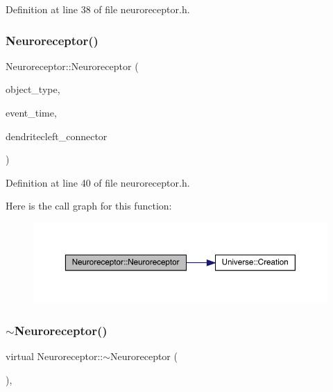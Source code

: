 Definition at line 38 of file neuroreceptor.\+h.

\mbox{\label{class_neuroreceptor_ab002bab3b4ffeed402f60e574ce0263e}} 
\subsubsection{\texorpdfstring{Neuroreceptor()}{Neuroreceptor()}\hspace{0.1cm}{\footnotesize\ttfamily [4/4]}}
{\footnotesize\ttfamily Neuroreceptor\+::\+Neuroreceptor (\begin{DoxyParamCaption}\item[{unsigned int}]{object\+\_\+type,  }\item[{std\+::chrono\+::time\+\_\+point$<$ \mbox{\hyperlink{universe_8h_a0ef8d951d1ca5ab3cfaf7ab4c7a6fd80}{Clock}} $>$}]{event\+\_\+time,  }\item[{\mbox{\hyperlink{class_dendrite_cleft}{Dendrite\+Cleft}} \&}]{dendritecleft\+\_\+connector }\end{DoxyParamCaption})\hspace{0.3cm}{\ttfamily [inline]}}



Definition at line 40 of file neuroreceptor.\+h.

Here is the call graph for this function\+:\nopagebreak
\begin{figure}[H]
\begin{center}
\leavevmode
\includegraphics[width=350pt]{class_neuroreceptor_ab002bab3b4ffeed402f60e574ce0263e_cgraph}
\end{center}
\end{figure}
\mbox{\label{class_neuroreceptor_ac9c1e9e985ed85712c14c85e306bebc9}} 
\subsubsection{\texorpdfstring{$\sim$\+Neuroreceptor()}{~Neuroreceptor()}}
{\footnotesize\ttfamily virtual Neuroreceptor\+::$\sim$\+Neuroreceptor (\begin{DoxyParamCaption}{ }\end{DoxyParamCaption})\hspace{0.3cm}{\ttfamily [inline]}, {\ttfamily [virtual]}}


